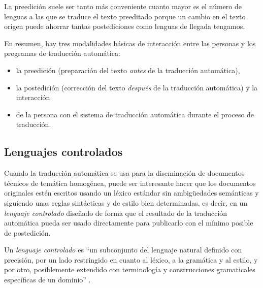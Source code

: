La preedición suele ser tanto más conveniente cuanto mayor es el número de lenguas a las que se traduce el texto preeditado porque un cambio en el texto origen puede ahorrar tantas postediciones como lenguas de llegada tengamos. 

En resumen, hay tres modalidades básicas de interacción entre las personas y los programas de traducción automática: \begin{itemize} \item la preedición (preparación del texto \emph{antes} de la traducción automática), \item la postedición (corrección del texto \emph{después} de la traducción automática) y la interacción \item de la persona con el sistema de traducción automática durante el proceso de traducción. \end{itemize} 


\subsection{Lenguajes controlados} \label{ss:llecon} Cuando la traducción automática se usa para la diseminación de documentos técnicos de temática homogénea, puede ser interesante hacer que los documentos originales estén escritos usando un léxico estándar sin ambigüedades semánticas y siguiendo unas reglas sintácticas y de estilo bien determinadas, es decir, en un \emph{lenguaje controlado} \citep{wojcik96uno,arnold94b,o2003controlling} diseñado de forma que el resultado de la traducción automática pueda ser usado directamente para publicarlo con el mínimo posible de postedición. 

Un \emph{lenguaje controlado} es ``un subconjunto del lenguaje natural definido con precisión, por un lado restringido en cuanto al léxico, a la gramática y al estilo, y por otro, posiblemente extendido con terminología y construcciones gramaticales específicas de un dominio'' \citep{huijsen98u}. 

